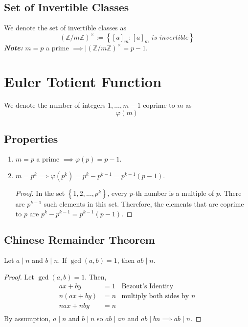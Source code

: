 \documentclass{report}
\newcommand{\Z}{\mathbb{Z}}
\newcommand{\modclass}[1]{\Z/{#1}\Z}
\newcommand{\textib}[1]{\textit{\textbf{{#1}}}}
\newcommand{\lemma}[1]{\begin{tcolorbox}[title=\textit{Lemma}]{#1}\end{tcolorbox}}
\begin{document}
\subsection{Set of Invertible Classes}
We denote the set of invertible classes as
\[\left( \modclass{m} \right)^{\times} := \left\{ [a]_m : [a]_m \textit{ is invertible} \right\}\]
\textib{Note:} $m = p$ a prime $\implies |\left( \modclass{m} \right)^{\times} = p - 1$.


\section{Euler Totient Function}
We denote the number of integers $1, \ldots, m - 1$ coprime to $m$ as
\[\varphi(m)\]


\subsection{Properties}
\begin{enumerate}[label=\textit{(\roman*)}]
    \item $m = p$ a prime $\implies \varphi(p) = p - 1$.
    \item $m = p^k \implies \varphi(p^k) = p^k - p^{k - 1} = p^{k - 1}(p - 1)$.
        \begin{proof}
            In the set $\left\{ 1, 2, \ldots, p^k \right\}$, every $p$-th number is a multiple of
            $p$. There are $p^{k - 1}$ such elements in this set. Therefore, the elements that are
            coprime to $p$ are $p^k - p^{k - 1} = p^{k - 1}(p - 1)$.
        \end{proof}
\end{enumerate}


\subsection{Chinese Remainder Theorem}

\lemma {
    Let $a \mid n$ and $b \mid n$. If $\gcd(a, b) = 1$, then $ab \mid n$.
}
\begin{proof}
    Let $\gcd(a, b) = 1$. Then,
    \begin{align*}
        ax + by &= 1 & \text{Bezout's Identity} \\
        n(ax + by) &= n & \text{multiply both sides by } n \\
        nax + nby &= n \\
    \end{align*}
    By assumption, $a \mid n$ and $b \mid n$ so $ab \mid an$ and $ab \mid bn \implies ab \mid n$.
\end{proof}
\end{document}
